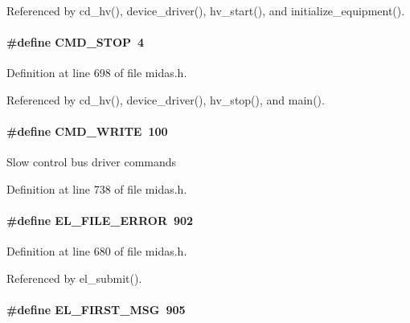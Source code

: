 Referenced by cd\_\-hv(), device\_\-driver(), hv\_\-start(), and initialize\_\-equipment().
\paragraph[{CMD\_\-STOP}]{\setlength{\rightskip}{0pt plus 5cm}\#define CMD\_\-STOP~4}\hfill\label{group__err26_ga46dc7ae84992bfe62cc00731959a67f4}


Definition at line 698 of file midas.h.

Referenced by cd\_\-hv(), device\_\-driver(), hv\_\-stop(), and main().
\paragraph[{CMD\_\-WRITE}]{\setlength{\rightskip}{0pt plus 5cm}\#define CMD\_\-WRITE~100}\hfill\label{group__err26_ga7391deb9c3a262ded3e186e94eb884e2}
Slow control bus driver commands 

Definition at line 738 of file midas.h.
\paragraph[{EL\_\-FILE\_\-ERROR}]{\setlength{\rightskip}{0pt plus 5cm}\#define EL\_\-FILE\_\-ERROR~902}\hfill\label{group__err26_gae97067062620fe28d93670c390f23533}

\begin{DoxyItemize}
\item 
\end{DoxyItemize}

Definition at line 680 of file midas.h.

Referenced by el\_\-submit().
\paragraph[{EL\_\-FIRST\_\-MSG}]{\setlength{\rightskip}{0pt plus 5cm}\#define EL\_\-FIRST\_\-MSG~905}\hfill\label{group__err26_gaac4d08b2b3c0c6755a104864de2ec8f0}

\begin{DoxyItemize}
\item 
\end{DoxyItemize}


